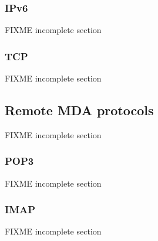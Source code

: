 \subsubsection{IPv6}
\cite{RFC2460}
FIXME incomplete section

\subsubsection{TCP}
FIXME incomplete section

\subsection{Remote MDA protocols}
FIXME incomplete section

\subsubsection{POP3}
\cite{RFC1939}
FIXME incomplete section

\subsubsection{IMAP}
\cite{RFC3501}
FIXME incomplete section

